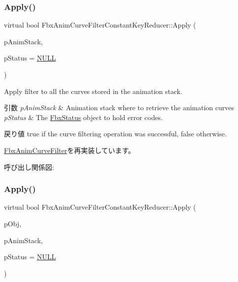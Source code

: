 \subsubsection{\texorpdfstring{Apply()}{Apply()}\hspace{0.1cm}{\footnotesize\ttfamily [1/5]}}
{\footnotesize\ttfamily virtual bool Fbx\+Anim\+Curve\+Filter\+Constant\+Key\+Reducer\+::\+Apply (\begin{DoxyParamCaption}\item[{\hyperlink{class_fbx_anim_stack}{Fbx\+Anim\+Stack} $\ast$}]{p\+Anim\+Stack,  }\item[{\hyperlink{class_fbx_status}{Fbx\+Status} $\ast$}]{p\+Status = {\ttfamily \hyperlink{fbxarch_8h_a070d2ce7b6bb7e5c05602aa8c308d0c4}{N\+U\+LL}} }\end{DoxyParamCaption})\hspace{0.3cm}{\ttfamily [virtual]}}

Apply filter to all the curves stored in the animation stack. 
\begin{DoxyParams}{引数}
{\em p\+Anim\+Stack} & Animation stack where to retrieve the animation curves \\
\hline
{\em p\+Status} & The \hyperlink{class_fbx_status}{Fbx\+Status} object to hold error codes. \\
\hline
\end{DoxyParams}
\begin{DoxyReturn}{戻り値}
{\ttfamily true} if the curve filtering operation was successful, {\ttfamily false} otherwise. 
\end{DoxyReturn}


\hyperlink{class_fbx_anim_curve_filter_aef3900e6180e05661c27ee484ae939c3}{Fbx\+Anim\+Curve\+Filter}を再実装しています。

呼び出し関係図\+:
\mbox{\label{class_fbx_anim_curve_filter_constant_key_reducer_a08bf131629e3e1bc798a342cd479c2e4}} 
\subsubsection{\texorpdfstring{Apply()}{Apply()}\hspace{0.1cm}{\footnotesize\ttfamily [2/5]}}
{\footnotesize\ttfamily virtual bool Fbx\+Anim\+Curve\+Filter\+Constant\+Key\+Reducer\+::\+Apply (\begin{DoxyParamCaption}\item[{\hyperlink{class_fbx_object}{Fbx\+Object} $\ast$}]{p\+Obj,  }\item[{\hyperlink{class_fbx_anim_stack}{Fbx\+Anim\+Stack} $\ast$}]{p\+Anim\+Stack,  }\item[{\hyperlink{class_fbx_status}{Fbx\+Status} $\ast$}]{p\+Status = {\ttfamily \hyperlink{fbxarch_8h_a070d2ce7b6bb7e5c05602aa8c308d0c4}{N\+U\+LL}} }\end{DoxyParamCaption})\hspace{0.3cm}{\ttfamily [virtual]}}

